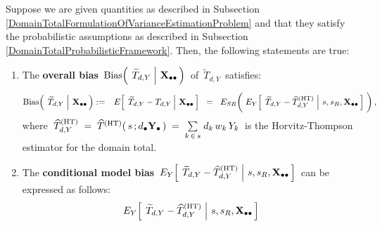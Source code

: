 
\vskip 0.3cm
\begin{lemma}
\label{biasTtilde}
\mbox{}
\vskip 0.1cm
\noindent
Suppose we are given quantities as described in Subsection
\ref{DomainTotalFormulationOfVarianceEstimationProblem}
and
that they satisfy the probabilistic assumptions as described in Subsection
\ref{DomainTotalProbabilisticFramework}.
\vskip 0.1cm
\noindent
Then, the following statements are true:
\renewcommand{\theenumi}{\roman{enumi}}
\renewcommand{\labelenumi}{\mbox{}\;\;\,(\theenumi)$\quad$}
\begin{enumerate}
\item
    The \textbf{overall bias}
    \,$
    \textnormal{Bias}\!\left(\;
        \left.
        \widetilde{T}_{d,Y}
        \;\right\vert\,
        \mathbf{X}_{\bullet\bullet}
        \,\right)
    $\,
    of
    \,$\widetilde{T}_{d,Y}$\,
    satisfies:
    \begin{eqnarray*}
    \bias\!\left(\;
        \left.
        \widetilde{T}_{d,Y}
        \;\right\vert\,
        \Xobs
        \,\right)
    & := &
        E\!\left[\;
            \left.
            \widetilde{T}_{d,Y} - T_{d,Y}
            \,\right\vert\,
            \Xobs
            \,\right]
    \;\; = \;\;
        E_{SR}\!\left(\;
            \overset{{\color{white}.}}{E_{Y}\!\left[\;
                \left.
                \widetilde{T}_{d,Y} \overset{{\color{white}.}}{-} \widehat{T}^{\textnormal{(HT)}}_{d,Y}
                \;\right\vert\,
                s,s_{R},\Xobs
                \,\right]}
            \;\right),
    \end{eqnarray*}
    where
    \,$
    \widehat{T}^{\textnormal{(HT)}}_{d,Y}
    \; = \;
        \widehat{T}^{\textnormal{(HT)}}(\,s\,;d_{\bullet}\mathbf{Y}_{\bullet}\,)
    \; = \;
        \underset{k\,\in\,s}{\sum}\;d_{k}\,w_{k}\,Y_{k}
    $\,
    is the Horvitz-Thompson estimator for the domain total.
\item
    The \textbf{conditional model bias}
    \,$
    E_{Y}\!\left[\;
        \left.
        \widetilde{T}_{d,Y} \overset{{\color{white}.}}{-} \widehat{T}^{\textnormal{(HT)}}_{d,Y}
        \;\right\vert\,
        s,s_{R},\Xobs
        \,\right]
    $\,
    can be expressed as follows:
    \begin{eqnarray*}
    E_{Y}\!\left[\;
        \left.
        \widetilde{T}_{d,Y} \overset{{\color{white}.}}{-} \widehat{T}^{\textnormal{(HT)}}_{d,Y}
        \;\right\vert\,
        s,s_{R},\Xobs
        \,\right]

\end{eqnarray*}
\end{enumerate}
\end{lemma}

